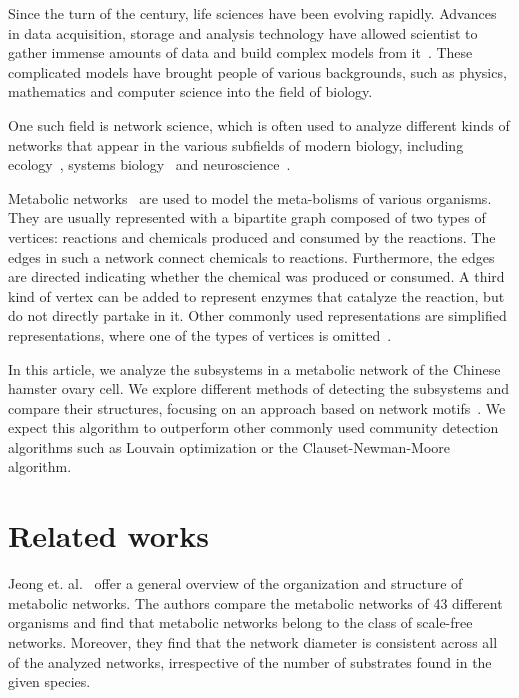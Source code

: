 Since the turn of the century, life sciences have been evolving
rapidly. Advances in data acquisition, storage and analysis technology have
allowed scientist to gather immense amounts of data and build complex models
from it~\cite{modsys}. These complicated models have brought people of various
backgrounds, such as physics, mathematics and computer science into the field
of biology.

One such field is network science, which
is often used to analyze different kinds of networks that appear in the various
subfields of modern biology, including ecology~\cite{proulx2005network}, systems
biology~\cite{barabasi2004network} and neuroscience~\cite{sporns2014contributions}.

Metabolic networks~\cite{jeong2000large} are used to model the meta-bolisms of
various organisms. They are usually represented with a bipartite graph composed
of two types of vertices: reactions and chemicals produced and consumed by the
reactions. The edges in such a network connect chemicals to
reactions. Furthermore, the edges are directed indicating whether the chemical
was produced or consumed. A third kind of vertex can be added to represent
enzymes that catalyze the reaction, but do not directly partake in
it. Other commonly used representations are simplified representations, where
one of the types of vertices is omitted~\cite{newman2010networks}.

In this article, we analyze the subsystems in a metabolic network of the Chinese
hamster ovary cell. We explore different methods of detecting the subsystems and
compare their structures, focusing on an approach based on network
motifs~\cite{benson2016higher}. We expect this algorithm to outperform other
commonly used community detection algorithms such as Louvain optimization or the
Clauset-Newman-Moore algorithm.

\section{Related works}
\label{sec:related}

Jeong et. al.~\cite{jeong2000large} offer a general overview of the organization
and structure of metabolic networks. The authors compare the metabolic networks
of 43 different organisms and find that metabolic networks belong to the class
of scale-free networks. Moreover, they find that the network diameter is
consistent across all of the analyzed networks, irrespective of the number of
substrates found in the given species.


